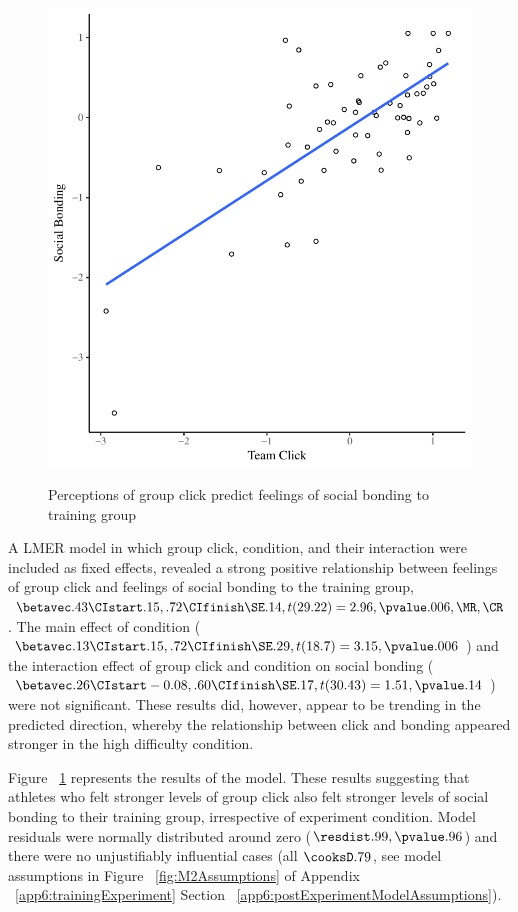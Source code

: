 \begin{figure}
  \centering
    \includegraphics[width=0.5\linewidth,keepaspectratio] {images/groupClickBondScatter}
    \label{fig:groupClickBondScatter}
    \caption{Perceptions of group click predict feelings of social bonding to training group}
\end{figure}

A LMER model in which group click, condition, and their interaction were included as fixed effects, revealed a strong positive relationship between feelings of group click and feelings of social bonding to the training group, $\betavec .43 \CIstart .15, .72 \CIfinish \SE .14, t(29.22) = 2.96, \pvalue .006, \MR , \CR $.
The main effect of condition ($\betavec .13 \CIstart .15, .72 \CIfinish \SE .29, t(18.7) = 3.15, \pvalue .006$) and the interaction effect of group click and condition on social bonding ($\betavec .26 \CIstart -0.08, .60 \CIfinish \SE .17, t(30.43) = 1.51, \pvalue .14$) were not significant.  These results did, however, appear to be trending in the predicted direction, whereby the relationship between click and bonding appeared stronger in the high difficulty condition.

Figure ~\ref{fig:groupClickBondScatter} represents the results of the model.  These results suggesting that athletes who felt stronger levels of group click also felt stronger levels of social bonding to their training group, irrespective of experiment condition.  Model residuals were normally distributed around zero ($\resdist .99, \pvalue .96$) and there were no unjustifiably influential cases (all $\cooksD .79$, see model assumptions in Figure ~\ref{fig:M2Assumptions} of Appendix ~\ref{app6:trainingExperiment} Section ~\ref{app6:postExperimentModelAssumptions}).







